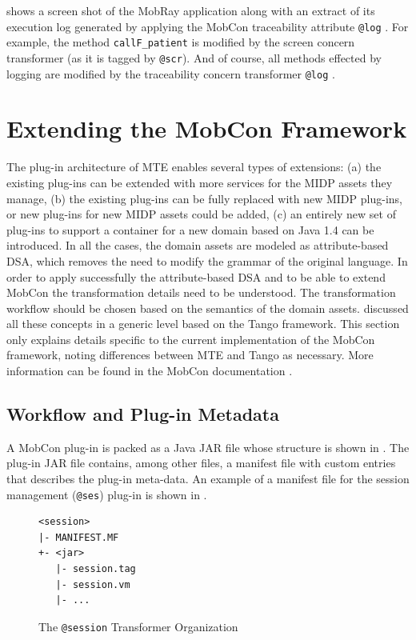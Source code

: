  shows a screen shot of the MobRay application along with an extract of its execution log generated by applying the MobCon traceability attribute \texttt{@log} . For example, the method \texttt{callF\_pa\-tient} is modified by the screen concern transformer (as it is tagged by \texttt{@scr}). And of course, all methods effected by logging are modified by the traceability concern transformer \texttt{@log} . 

\section{Extending the MobCon Framework}
\label{sec.mc.extend}

The plug-in architecture of MTE  enables several types of extensions: (a) the existing plug-ins can be extended with more services for the MIDP assets they manage, (b) the existing plug-ins can be fully replaced with new MIDP plug-ins, or new plug-ins for new MIDP assets could be added, (c) an entirely new set of plug-ins to support a container for a new domain based on Java 1.4 can be introduced. In all the cases, the domain assets are modeled as attribute-based DSA, which removes the need to modify the grammar of the original language. In order to apply successfully the attribute-based DSA and to be able to extend MobCon the transformation details need to be understood. The transformation workflow should be chosen based on the semantics of the domain assets.  discussed all these concepts in a generic level based on the Tango framework. This section only explains details specific to the current implementation of the MobCon framework, noting differences between MTE and Tango as necessary. More information can be found in the MobCon documentation \cite{vasian.mobcon.03}.

\subsection{Workflow and Plug-in Metadata}
\label{sec.mc.wf}

A MobCon plug-in is packed as a Java JAR file whose structure is shown in . The plug-in JAR file contains, among  other files, a manifest file with custom entries that describes the plug-in meta-data. An example of a manifest file for the session management (\texttt{@ses}) plug-in is shown in .

\begin{figure}[ht]
	\centering
	\begin{minipage}[b]{5cm}
	\begin{center}	
\begin{footnotesize}
\begin{verbatim}
<session>
|- MANIFEST.MF
+- <jar>
   |- session.tag
   |- session.vm
   |- ... 
\end{verbatim}
\end{footnotesize}
	\end{center}
		\end{minipage}	
	\caption{The \texttt{@session} Transformer Organization}
	\label{mc:scr-dirs}

\end{figure}

